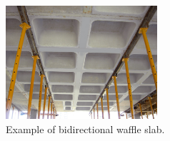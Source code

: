 \begin{figure}[H]
	\centering
	\includegraphics[clip, trim=0cm 0cm 0cm 0cm, width=0.5\textwidth]{./images/TipologiaEstructural/waffleslab}
	\caption{Example of bidirectional waffle slab.}
	\label{slab}
\end{figure}



	
